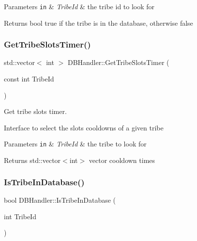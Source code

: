 \begin{DoxyParams}[1]{Parameters}
\mbox{\tt in}  & {\em Tribe\+Id} & the tribe id to look for \\
\hline
\end{DoxyParams}
\begin{DoxyReturn}{Returns}
bool true if the tribe is in the database, otherwise false 
\end{DoxyReturn}
\mbox{\label{class_d_b_handler_aa829e3513b65be297f2bd4e5ab042e35}} 
\subsubsection{\texorpdfstring{Get\+Tribe\+Slots\+Timer()}{GetTribeSlotsTimer()}}
{\footnotesize\ttfamily std\+::vector$<$ int $>$ D\+B\+Handler\+::\+Get\+Tribe\+Slots\+Timer (\begin{DoxyParamCaption}\item[{const int}]{Tribe\+Id }\end{DoxyParamCaption})}



Get tribe slots timer. 

Interface to select the slots cooldowns of a given tribe


\begin{DoxyParams}[1]{Parameters}
\mbox{\tt in}  & {\em Tribe\+Id} & the tribe to look for \\
\hline
\end{DoxyParams}
\begin{DoxyReturn}{Returns}
std\+::vector$<$int$>$ vector cooldown times 
\end{DoxyReturn}
\mbox{\label{class_d_b_handler_a4dc6835ae9459d3faacb8131b67a00d3}} 
\subsubsection{\texorpdfstring{Is\+Tribe\+In\+Database()}{IsTribeInDatabase()}}
{\footnotesize\ttfamily bool D\+B\+Handler\+::\+Is\+Tribe\+In\+Database (\begin{DoxyParamCaption}\item[{int}]{Tribe\+Id }\end{DoxyParamCaption})}



